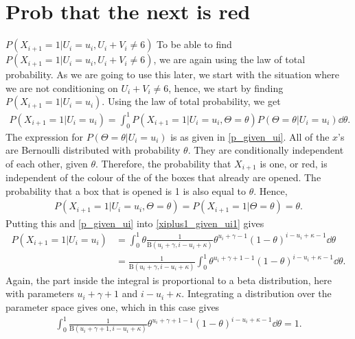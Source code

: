 \section{Prob that the next is red}
$P(X_{i+1}=1|U_i=u_i,U_i+V_i\neq6)$
To be able to find $P(X_{i+1}=1|U_i=u_i,U_i+V_i\neq6)$, we are again using the law of total probability. As we are going to use this later, we start with the situation where we are not conditioning on $U_i+V_i\neq6$, hence, we start by finding $P(X_{i+1}=1|U_i=u_i)$. Using the law of total probability, we get
\begin{equation}
\label{xiplus1_given_ui1}
    \begin{aligned}
        P(X_{i+1}=1|U_i=u_i)
        = \int_0^1 P(X_{i+1}=1|U_i=u_i,\Theta=\theta)P(\Theta=\theta|U_i=u_i) \dd \theta.
    \end{aligned}
\end{equation}
The expression for $P(\Theta=\theta|U_i=u_i)$ is as given in \eqref{p_given_ui}. All of the $x$'s are Bernoulli distributed with probability $\theta$. They are conditionally independent of each other, given $\theta$. Therefore, the probability that $X_{i+1}$ is one, or red, is independent of the colour of the of the boxes that already are opened. The probability that a box that is opened is 1 is also equal to $\theta$. Hence,
\begin{equation*}
    \begin{aligned}
        P(X_{i+1}=1|U_i=u_i,\Theta=\theta) = P(X_{i+1}=1|\Theta=\theta) = \theta.
    \end{aligned}
\end{equation*}
Putting this and \eqref{p_given_ui} into \eqref{xiplus1_given_ui1} gives
\begin{equation}
\label{xiplus1_given_ui2}
    \begin{aligned}
        P(X_{i+1}=1|U_i=u_i)
        &= \int_0^1 \theta \frac{1}{\text{B}(u_i+\gamma,i-u_i+\kappa)}\theta^{u_i+\gamma-1}(1-\theta)^{i-u_i+\kappa-1}  \dd \theta\\[6pt]
        &=\frac{1}{\text{B}(u_i+\gamma,i-u_i+\kappa)} \int_0^1 \theta^{u_i+\gamma+1-1}(1-\theta)^{i-u_i+\kappa-1} \dd \theta.
    \end{aligned}
\end{equation}
Again, the part inside the integral is proportional to a beta distribution, here with parameters $u_i+\gamma+1$ and $i-u_i+\kappa$. Integrating a distribution over the parameter space gives one, which in this case gives
\begin{equation*}
    \begin{aligned}
        \int_0^1 \frac{1}{\text{B}(u_i+\gamma+1,i-u_i+\kappa)} \theta^{u_i+\gamma+1-1}(1-\theta)^{i-u_i+\kappa-1}  \dd \theta = 1.
    \end{aligned}
\end{equation*}
